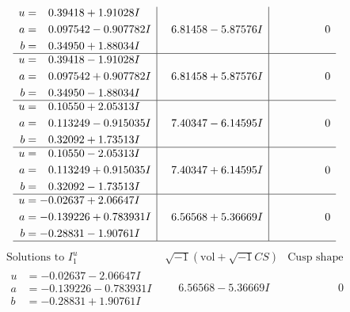 \documentclass[1p]{elsarticle_modified}
\theoremstyle{definition}
\newcommand{\I}{\sqrt{-1}}
\begin{document}
$$\begin{array}{c|c|c}
\begin{aligned}
u &= \phantom{-}0.39418 + 1.91028 I \\
a &= \phantom{-}0.097542 - 0.907782 I \\
b &= \phantom{-}0.34950 + 1.88034 I\end{aligned}
 & \phantom{-}6.81458 - 5.87576 I & \phantom{-0.000000 } 0 \\ \hline\begin{aligned}
u &= \phantom{-}0.39418 - 1.91028 I \\
a &= \phantom{-}0.097542 + 0.907782 I \\
b &= \phantom{-}0.34950 - 1.88034 I\end{aligned}
 & \phantom{-}6.81458 + 5.87576 I & \phantom{-0.000000 } 0 \\ \hline\begin{aligned}
u &= \phantom{-}0.10550 + 2.05313 I \\
a &= \phantom{-}0.113249 - 0.915035 I \\
b &= \phantom{-}0.32092 + 1.73513 I\end{aligned}
 & \phantom{-}7.40347 - 6.14595 I & \phantom{-0.000000 } 0 \\ \hline\begin{aligned}
u &= \phantom{-}0.10550 - 2.05313 I \\
a &= \phantom{-}0.113249 + 0.915035 I \\
b &= \phantom{-}0.32092 - 1.73513 I\end{aligned}
 & \phantom{-}7.40347 + 6.14595 I & \phantom{-0.000000 } 0 \\ \hline\begin{aligned}
u &= -0.02637 + 2.06647 I \\
a &= -0.139226 + 0.783931 I \\
b &= -0.28831 - 1.90761 I\end{aligned}
 & \phantom{-}6.56568 + 5.36669 I & \phantom{-0.000000 } 0\\
 \hline 
 \end{array}$$\newpage$$\begin{array}{c|c|c}  
\text{Solutions to }I^u_{1}& \I (\text{vol} + \sqrt{-1}CS) & \text{Cusp shape}\\
 \hline 
\begin{aligned}
u &= -0.02637 - 2.06647 I \\
a &= -0.139226 - 0.783931 I \\
b &= -0.28831 + 1.90761 I\end{aligned}
 & \phantom{-}6.56568 - 5.36669 I & \phantom{-0.000000 } 0 \\ \hline\begin{aligned}

\end{aligned}
\end{array}$$
\end{document}
